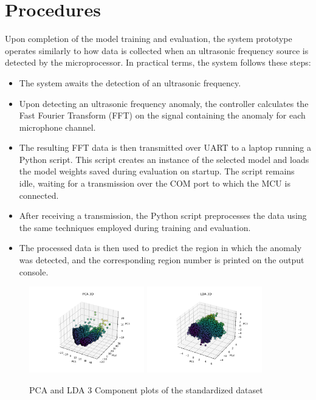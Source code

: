 \documentclass[conference]{IEEEtran}
\begin{document}
\section{Procedures}
Upon completion of the model training and evaluation, the system prototype operates similarly to how data is collected when an ultrasonic frequency source is detected by the microprocessor. In practical terms, the system follows these steps:
\begin{itemize}
    \item The system awaits the detection of an ultrasonic frequency.
    \item Upon detecting an ultrasonic frequency anomaly, the controller calculates the Fast Fourier Transform (FFT) on the signal containing the anomaly for each microphone channel.
    \item The resulting FFT data is then transmitted over UART to a laptop running a Python script. This script creates an instance of the selected model and loads the model weights saved during evaluation on startup. The script remains idle, waiting for a transmission over the COM port to which the MCU is connected.
    \item After receiving a transmission, the Python script preprocesses the data using the same techniques employed during training and evaluation.
    \item The processed data is then used to predict the region in which the anomaly was detected, and the corresponding region number is printed on the output console.
\end{itemize}
\begin{figure}[htbp]
    \centering
    \includegraphics[width=5cm]{figs/nn/pca_3d.png} %
    \includegraphics[width=5cm]{figs/nn/lda_3d.png} %
    \caption{PCA and LDA 3 Component plots of the standardized dataset}
    \label{fig5}
\end{figure}
\end{document}
